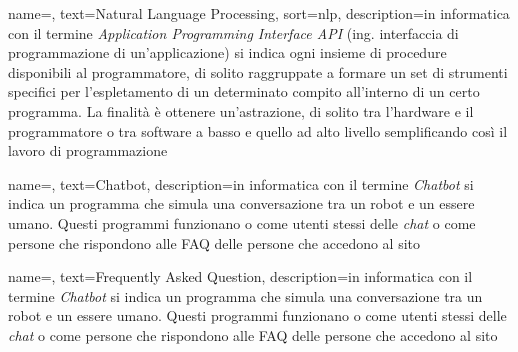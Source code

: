 
\renewcommand{\acronymname}{Acronimi e abbreviazioni}


{
    name=,
    text=Natural Language Processing,
    sort=nlp,
    description={in informatica con il termine \emph{Application Programming Interface API} (ing. interfaccia di programmazione di un'applicazione) si indica ogni insieme di procedure disponibili al programmatore, di solito raggruppate a formare un set di strumenti specifici per l'espletamento di un determinato compito all'interno di un certo programma. La finalità è ottenere un'astrazione, di solito tra l'hardware e il programmatore o tra software a basso e quello ad alto livello semplificando così il lavoro di programmazione}
}



{
    name=,
    text=Chatbot,
    description={in informatica con il termine \emph{Chatbot} si indica un programma che simula una conversazione tra un robot e un essere umano. Questi programmi funzionano o come utenti stessi delle \emph{chat} o come persone che rispondono alle FAQ delle persone che accedono al sito}
}

{
    name=,
    text=Frequently Asked Question,
    description={in informatica con il termine \emph{Chatbot} si indica un programma che simula una conversazione tra un robot e un essere umano. Questi programmi funzionano o come utenti stessi delle \emph{chat} o come persone che rispondono alle FAQ delle persone che accedono al sito}
}
